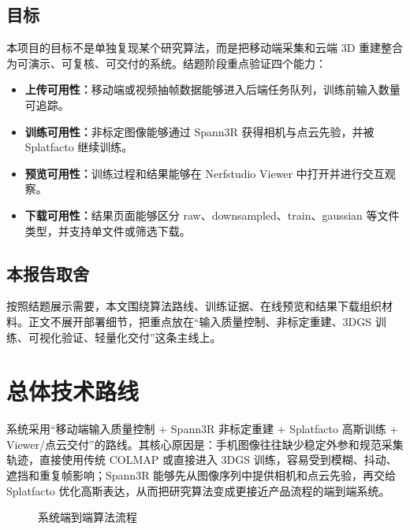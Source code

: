 ﻿\documentclass[12pt]{article}
\begin{document}
\subsection{目标}
本项目的目标不是单独复现某个研究算法，而是把移动端采集和云端 3D 重建整合为可演示、可复核、可交付的系统。结题阶段重点验证四个能力：

\begin{itemize}
\item \textbf{上传可用性：}移动端或视频抽帧数据能够进入后端任务队列，训练前输入数量可追踪。
\item \textbf{训练可用性：}非标定图像能够通过 Spann3R 获得相机与点云先验，并被 Splatfacto 继续训练。
\item \textbf{预览可用性：}训练过程和结果能够在 Nerfstudio Viewer 中打开并进行交互观察。
\item \textbf{下载可用性：}结果页面能够区分 raw、downsampled、train、gaussian 等文件类型，并支持单文件或筛选下载。
\end{itemize}

\subsection{本报告取舍}
按照结题展示需要，本文围绕算法路线、训练证据、在线预览和结果下载组织材料。正文不展开部署细节，把重点放在“输入质量控制、非标定重建、3DGS 训练、可视化验证、轻量化交付”这条主线上。

\section{总体技术路线}
系统采用“移动端输入质量控制 + Spann3R 非标定重建 + Splatfacto 高斯训练 + Viewer/点云交付”的路线。其核心原因是：手机图像往往缺少稳定外参和规范采集轨迹，直接使用传统 COLMAP 或直接进入 3DGS 训练，容易受到模糊、抖动、遮挡和重复帧影响；Spann3R 能够先从图像序列中提供相机和点云先验，再交给 Splatfacto 优化高斯表达，从而把研究算法变成更接近产品流程的端到端系统。

\begin{figure}[H]
\centering
{}
\caption{系统端到端算法流程}
\end{figure}
\end{document}
